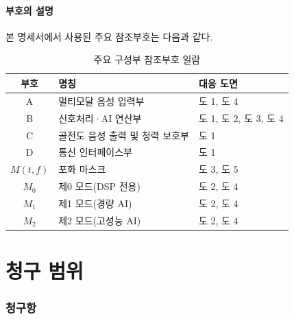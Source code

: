 \documentclass{article}
\begin{document}
\subsection{부호의 설명}

본 명세서에서 사용된 주요 참조부호는 다음과 같다.

\begin{table}[H]
    \centering
    \renewcommand{\arraystretch}{1.2}
    \begin{tabular}{c|l|l}
        \hline
        \textbf{부호} & \textbf{명칭} & \textbf{대응 도면} \\
        \hline\hline
        A & 멀티모달 음성 입력부 & 도 1, 도 4 \\
        \hline
        B & 신호처리·AI 연산부 & 도 1, 도 2, 도 3, 도 4 \\
        \hline
        C & 골전도 음성 출력 및 청력 보호부 & 도 1 \\
        \hline
        D & 통신 인터페이스부 & 도 1 \\
        \hline
        $M(t,f)$ & 포화 마스크 & 도 3, 도 5 \\
        \hline
        $M_{0}$ & 제0 모드(DSP 전용) & 도 2, 도 4 \\
        \hline
        $M_{1}$ & 제1 모드(경량 AI) & 도 2, 도 4 \\
        \hline
        $M_{2}$ & 제2 모드(고성능 AI) & 도 2, 도 4 \\
        \hline
    \end{tabular}
    \caption{주요 구성부 참조부호 일람}
\end{table}


\part{청구 범위}

\section*{청구항}
\end{document}
